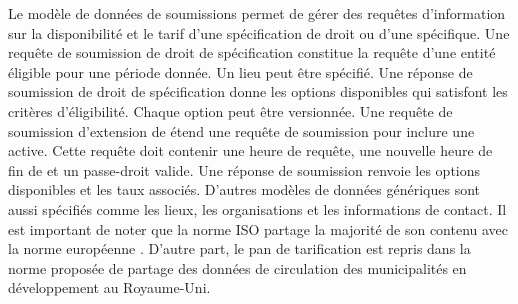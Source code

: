     Le modèle de données de soumissions permet de gérer des requêtes d'information sur la disponibilité et le tarif d'une spécification de droit ou d'une \fg{} spécifique. Une requête de soumission de droit de spécification constitue la requête d'une entité éligible pour une période donnée. Un lieu peut être spécifié.  Une réponse de soumission de droit de spécification donne les options disponibles qui satisfont les critères d'éligibilité. Chaque option peut être versionnée. Une requête de soumission d'extension de \fg{} étend une requête de soumission pour inclure une \fg{} active. Cette requête doit contenir une heure de requête, une nouvelle heure de fin de \fg{} et un passe-droit valide. Une réponse de soumission renvoie les options disponibles et les taux associés. D'autres modèles de données génériques sont aussi spécifiés comme les lieux, les organisations et les informations de contact. Il est important de noter que la norme \ac{ISO} partage la majorité de son contenu avec la norme européenne \parencite{deutsches_institut_fur_normung_din_2022}. D'autre part, le pan de tarification est repris dans la norme proposée de partage des données de circulation des municipalités en développement au Royaume-Uni.\parencite{department_for_transport_consultation_2022,department_for_transport_digital_2025}


  